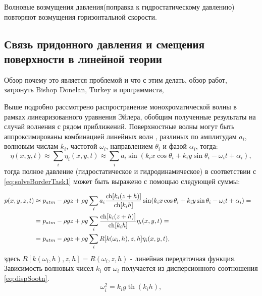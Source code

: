 Волновые возмущения давления(поправка к гидростатическому давлению) повторяют возмущения горизонтальной скорости.
\subsection{Связь придонного давления и смещения поверхности в линейной теории}


Обзор почему это является проблемой и что с этим делать, обзор работ, затронуть Bishop Donelan, Turkey и программиста, \cite{Huang_press}


Выше подробно рассмотрено распространение монохроматической волны в рамках линеаризованного уравнения Эйлера, обобщим полученные результаты на случай волнения с рядом приближений. Поверхностные волны могут быть аппроксимированы комбинацией линейных волн \cite{longeHigg}, разлиных по амплитудам $a_i$, волновым числам $k_i$, частотой $\omega_i$, направлением $\theta_i$ и фазой $\alpha_i$, тогда:
\begin{equation}\label{eq:approx}
    \eta(x,y,t)\approx\sum\limits_i\eta_i(x,y,t)\approx
    \sum\limits_i a_i\sin(k_ix\cos\theta_i+k_iy\sin\theta_i-\omega_i t+\alpha_i),
\end{equation}
\noindent
тогда полное давление (гидростатическое и гидродинамическое) в соответствии с \eqref{eq:solveBorderTask1}  может быть выражено с помощью следующей суммы:

\begin{align}\label{eq:approxPress}
    p(x,y,z,t) &\approx p_{atm}-\rho gz+\rho g \sum\limits_i a_i\frac{\operatorname{ch}[k_i(z+h)]}{\operatorname{ch}[k_ih]}\sin(k_ix\cos\theta_i+k_iy\sin\theta_i-\omega_i t+\alpha_i)=&\notag\\
    &=p_{atm}-\rho gz+\rho g\sum\limits_i\frac{\operatorname{ch}[k_i(z+h)]}{\operatorname{ch}[k_ih]}\eta_i(x,y,t)=&\\
    &=p_{atm}-\rho gz+\rho g\sum\limits_iR[k(\omega_i,h),z,h]\eta_i(x,y,t),&
\end{align}
\noindent
здесь $R[k(\omega_i,h),z,h]=R(\omega_i,z,h)$ - линейная передаточная функция. Зависимость волновых чисел $k_i$ от $\omega_i$ получается из дисперсионного соотношения \eqref{eq:dispSootn}.
\begin{equation}\label{eq:dispSootn1}
\omega_i^2=k_ig\operatorname{th}(k_ih),
\end{equation}

